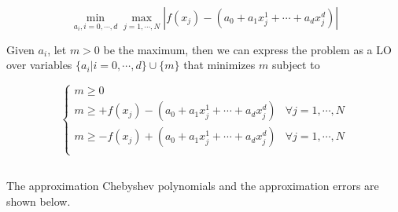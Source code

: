 \documentclass{article}
\newcommand{\1}{\bm 1}
\begin{document}
$$
\min_{a_i, i = 0,\cdots, d}\max_{j=1,\cdots,N}|f(x_j) - (a_0+a_1x_j^1+\cdots+a_dx_j^d)|
$$

Given $a_i$, let $m>0$ be the maximum, then we can express the problem as a LO over variables $\{a_i|i=0,\cdots,d\} \cup \{m\}$ that minimizes $m$ subject to

$$
\begin{cases}
    m \ge 0\\
    m \ge + f(x_j) - (a_0 + a_1x_j^1+\cdots+a_dx_j^d) & \forall j=1, \cdots, N\\
    m \ge - f(x_j) + (a_0 + a_1x_j^1+\cdots+a_dx_j^d) & \forall j=1, \cdots, N\\
\end{cases}
$$

\subsection{}

The approximation Chebyshev polynomials and the approximation errors are shown below.
\end{document}
